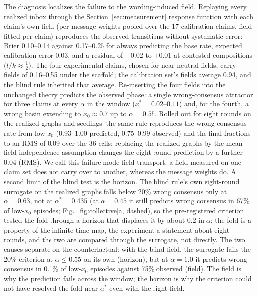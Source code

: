 \documentclass[11pt]{article}
\newcommand{\astar}{\alpha^{*}}
\begin{document}
The diagnosis localizes the failure to the wording-induced field. Replaying
every realized inbox through the Section~\ref{sec:measurement} response
function with each claim's own field (per-message weights pooled over the 17
calibration claims, field fitted per claim) reproduces the observed
transitions without systematic error: Brier 0.10--0.14 against 0.17--0.25 for
always predicting the base rate, expected calibration error 0.03, and a
residual of $-0.02$ to $+0.01$ at contested compositions
($l/k \approx \tfrac12$). The four experimental claims, chosen for
near-neutral fields, carry fields of 0.16--0.55 under the scaffold; the
calibration set's fields average 0.94, and the blind rule inherited that
average. Re-inserting the four fields into the unchanged theory predicts the
observed phase: a single wrong-consensus attractor for three claims at every
$\alpha$ in the window ($x^* = 0.02$--$0.11$) and, for the fourth, a wrong
basin extending to $x_0 \approx 0.7$ up to $\alpha = 0.55$. Rolled out for
eight rounds on the realized graphs and seedings, the same rule reproduces
the wrong-consensus rate from low $x_0$ (0.93--1.00 predicted, 0.75--0.99
observed) and the final fractions to an RMS of 0.09 over the 36 cells;
replacing the realized graphs by the mean-field independence assumption
changes the eight-round prediction by a further 0.04 (RMS). We call this
failure mode field transport: a field measured on one claim set does not
carry over to another, whereas the message weights do. A second limit of the
blind test is the horizon. The blind rule's own eight-round surrogate on the
realized graphs falls below 20\% wrong consensus only at $\alpha = 0.63$, not
at $\astar = 0.435$ (at $\alpha = 0.45$ it still predicts wrong consensus in
67\% of low-$x_0$ episodes; Fig.~\ref{fig:collective}a, dashed), so the
pre-registered criterion tested the fold through a horizon that displaces it
by about 0.2 in $\alpha$: the fold is a property of the infinite-time map,
the experiment a statement about eight rounds, and the two are compared
through the surrogate, not directly. The two causes separate on the
counterfactual: with the blind field, the surrogate fails the 20\% criterion
at $\alpha \le 0.55$ on its own (horizon), but at $\alpha = 1.0$ it predicts
wrong consensus in 0.1\% of low-$x_0$ episodes against 75\% observed (field).
The field is why the prediction fails across the window; the horizon is why
the criterion could not have resolved the fold near $\astar$ even with the
right field.
\end{document}
